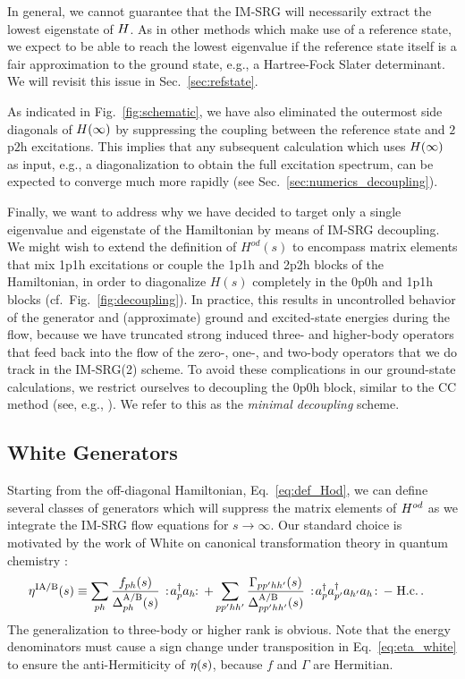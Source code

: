 In general, we cannot guarantee that the IM-SRG will necessarily extract the lowest eigenstate 
of $H$. As in other methods which make use of a reference state, we expect to be able to reach 
the lowest eigenvalue if the reference state itself is a fair approximation to the ground state, e.g., 
a Hartree-Fock Slater determinant. We will revisit this issue in Sec.~\ref{sec:refstate}.

As indicated in Fig.~\ref{fig:schematic}, we have also eliminated the outermost side diagonals of 
$H(\infty)$ by suppressing the coupling between the reference state and $2$p$2$h excitations. This 
implies that any subsequent calculation which uses $H(\infty)$ as input, e.g., a diagonalization to 
obtain the full excitation spectrum, can be expected to converge much more rapidly (see 
Sec.~\ref{sec:numerics_decoupling}). 

Finally, we want to address why we have decided to target only a single eigenvalue and eigenstate
of the Hamiltonian by means of IM-SRG decoupling. We might wish to extend the definition 
of $H^{od}(s)$ to encompass matrix elements that mix 1p1h excitations or couple the 1p1h and 2p2h 
blocks of the Hamiltonian, in order to diagonalize $H(s)$ completely in the 0p0h and 1p1h blocks 
(cf.~Fig.~\ref{fig:decoupling}). In practice, this results in uncontrolled behavior of the generator 
and (approximate) ground and excited-state energies during the flow, because we have truncated strong induced 
three- and higher-body operators that feed back into the flow of the zero-, one-, and two-body operators that
we do track in the IM-SRG(2) scheme. To avoid these complications in our ground-state calculations, we 
restrict ourselves to decoupling the 0p0h block, similar to the CC method (see, e.g., 
\cite{Shavitt:2009}). We refer to this as the \emph{minimal decoupling} scheme. 


\subsection{\label{sec:white}White Generators}
Starting from the off-diagonal Hamiltonian, Eq.~\eqref{eq:def_Hod}, we can define several classes of generators which will suppress the matrix elements of $H^{od}$ as we integrate the IM-SRG flow equations for $s\to\infty$. Our standard choice is motivated by the work of White on canonical transformation theory in quantum chemistry \cite{White:2002fk,Tsukiyama:2011uq}:
\begin{align}
  \etaO^\text{IA/B}(s)
  &\equiv\sum_{ph}\frac{f_{ph}(s)}{\Delta^\text{A/B}_{ph}(s)}\nord{\aaO_{p}\aO_{h}\!}
  +\sum_{pp'hh'}\frac{\Gamma_{pp'hh'}(s)}{\Delta^\text{A/B}_{pp'hh'}(s)}\nord{\aaO_{p}\aaO_{p'}\aO_{h'}\aO_{h}}-\;\text{H.c.}\,.\label{eq:eta_white}
\end{align}
The generalization to three-body or higher rank is obvious. Note that the energy denominators must cause a sign change under transposition in Eq.~\eqref{eq:eta_white} to ensure the anti-Hermiticity of $\eta(s)$, because $f$ and $\Gamma$ are Hermitian.

